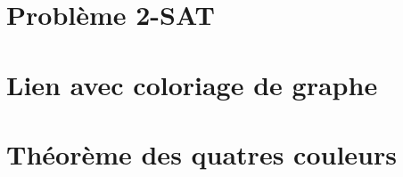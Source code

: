 \documentclass{tipe}
\begin{document}

\clearpage

\part{Problème 2-SAT}


\part{Lien avec coloriage de graphe}


\part{Théorème des quatres couleurs}




\end{document}
